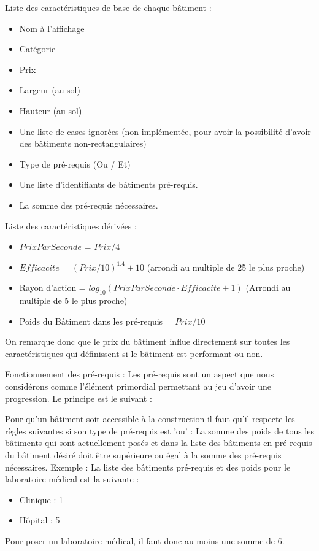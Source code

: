 \documentclass[a4paper,10pt,openany,oneside]{report}
\begin{document}
Liste des caractéristiques de base de chaque bâtiment :
\begin{itemize}
	\item Nom à l'affichage
	\item Catégorie
	\item Prix
	\item Largeur (au sol)
	\item Hauteur (au sol)
	\item Une liste de cases ignorées (non-implémentée, pour avoir la possibilité d'avoir des bâtiments non-rectangulaires)
	\item Type de pré-requis (Ou / Et)
	\item Une liste d'identifiants de bâtiments pré-requis.
	\item La somme des pré-requis nécessaires. 
\end{itemize}



Liste des caractéristiques dérivées :
\begin{itemize}
  \item $PrixParSeconde$ = \(Prix / 4\)
  \item $Efficacite$ = \((Prix/10)^{1.4} + 10\) (arrondi au multiple de 25 le plus proche)
  \item Rayon d'action = \(log_{10}(PrixParSeconde \cdot Efficacite + 1)\) (Arrondi au multiple de 5 le plus proche)
  \item Poids du Bâtiment dans les pré-requis = \(Prix / 10\)
\end{itemize}

On remarque donc que le prix du bâtiment influe directement sur toutes les caractéristiques qui définissent si le bâtiment est performant ou non.

Fonctionnement des pré-requis :
Les pré-requis sont un aspect que nous considérons comme l'élément primordial permettant au jeu d'avoir une progression. Le principe est le suivant :

Pour qu'un bâtiment soit accessible à la construction il faut qu'il respecte les règles suivantes si son type de pré-requis est 'ou' :
La somme des poids de tous les bâtiments qui sont actuellement posés et dans la liste des bâtiments en pré-requis du bâtiment désiré doit être supérieure ou égal à la somme des pré-requis nécessaires.
Exemple :
La liste des bâtiments pré-requis et des poids pour le laboratoire médical est la suivante :
\begin{itemize}
	\item Clinique : 1
	\item Hôpital : 5
\end{itemize}
Pour poser un laboratoire médical, il faut donc au moins une somme de 6.
\end{document}
